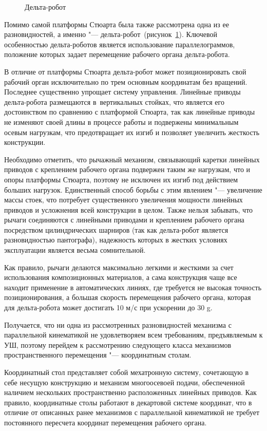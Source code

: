 \begin{figure}[ht]
	\caption{Дельта-робот}\label{fig:delta}
\end{figure}

Помимо самой платформы Стюарта была также рассмотрена одна из ее разновидностей, а именно "--- дельта-робот~(рисунок~\cref{fig:delta}). Ключевой особенностью дельта-роботов является использование параллелограммов, положение которых задает перемещение рабочего органа дельта-робота.

В отличие от платформы Стюарта дельта-робот может позиционировать свой рабочий орган исключительно по трем основным координатам без вращений. Последнее существенно упрощает систему управления. Линейные приводы дельта-робота размещаются в~вертикальных стойках, что является его достоинством по сравнению с платформой Стюарта, так как линейные приводы не изменяют своей длины в процессе работы и подвержены минимальным осевым нагрузкам, что предотвращает их изгиб и позволяет увеличить жесткость конструкции.

Необходимо отметить, что рычажный механизм, связывающий каретки линейных приводов с креплением рабочего органа подвержен таким же нагрузкам, что и опоры платформы Стюарта, поэтому не исключен их изгиб под действием больших нагрузок. Единственный способ борьбы с этим явлением "--- увеличение массы стоек, что потребует существенного увеличения мощности линейных приводов и усложнения всей конструкции в целом. Также нельзя забывать, что рычаги соединяются с линейными приводами и креплением рабочего органа посредством цилиндрических шарниров (так как дельта-робот является разновидностью пантографа), надежность которых в жестких условиях эксплуатации является весьма сомнительной.

Как правило, рычаги делаются максимально легкими и жесткими за счет использования композиционных материалов, а сама конструкция чаще все находит применение в автоматических линиях, где требуется не высокая точность позиционирования, а большая скорость перемещения рабочего органа, которая для дельта-робота может достигать 10 м/с при ускорении до 30 g.

Получается, что ни одна из рассмотренных разновидностей механизма с параллельной кинематикой не удовлетворяем всем требованиям, предъявляемым к УШ, поэтому перейдем к рассмотрению следующего класса механизмов пространственного перемещения "--- координатным столам.

Координатный стол представляет собой мехатронную систему, сочетающую в себе несущую конструкцию и механизм многоосевоей подачи, обеспеченной наличием нескольких пространственно расположенных линейных приводов. Как правило, координатные столы работают в декартовой системе координат, что в отличие от описанных ранее механизмов с параллельной кинематикой не требует постоянного пересчета координат перемещения рабочего органа.

